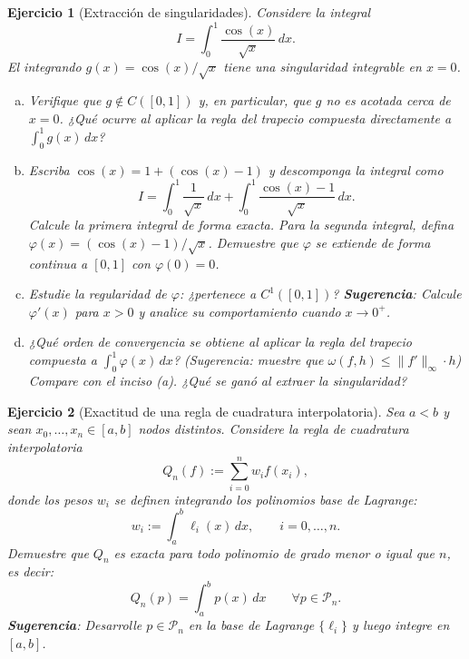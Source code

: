 \documentclass[12pt]{article}
\newtheorem{exercise}{Ejercicio}
\begin{document}
\begin{exercise}[Extracción de singularidades]
Considere la integral
\[
I = \int_0^1 \frac{\cos(x)}{\sqrt{x}}\, dx.
\]
El integrando $g(x) = \cos(x)/\sqrt{x}$ tiene una singularidad integrable en $x = 0$.
\begin{enumerate}[(a)]
\item Verifique que $g \notin C([0,1])$ y, en particular, que $g$ no es acotada cerca de $x = 0$. ¿Qué ocurre al aplicar la regla del trapecio compuesta directamente a $\int_0^1 g(x)\,dx$?
\item Escriba $\cos(x) = 1 + (\cos(x) - 1)$ y descomponga la integral como
\[
I = \int_0^1 \frac{1}{\sqrt{x}}\, dx + \int_0^1 \frac{\cos(x) - 1}{\sqrt{x}}\, dx.
\]
Calcule la primera integral de forma exacta. Para la segunda integral, defina $\varphi(x) = (\cos(x) - 1)/\sqrt{x}$. Demuestre que $\varphi$ se extiende de forma continua a $[0, 1]$ con $\varphi(0) = 0$.
\item Estudie la regularidad de $\varphi$: ¿pertenece a $C^1([0,1])$? \textbf{Sugerencia}: Calcule $\varphi'(x)$ para $x > 0$ y analice su comportamiento cuando $x \to 0^+$.
\item ¿Qué orden de convergencia se obtiene al aplicar la regla del trapecio compuesta a $\int_0^1 \varphi(x)\,dx$? (Sugerencia: muestre que $\omega(f, h) \leq \|f'\|_\infty \cdot h$) Compare con el inciso (a). ¿Qué se ganó al extraer la singularidad?
\end{enumerate}
\end{exercise}

\begin{exercise}[Exactitud de una regla de cuadratura interpolatoria]
Sea $a<b$ y sean $x_0,\ldots,x_n\in[a,b]$ nodos distintos. Considere la regla de cuadratura interpolatoria
\[
Q_n(f):=\sum_{i=0}^{n} w_i f(x_i),
\]
donde los pesos $w_i$ se definen integrando los polinomios base de Lagrange:
\[
w_i:=\int_a^b \ell_i(x)\,dx, \qquad i=0,\ldots,n.
\]
Demuestre que $Q_n$ es exacta para todo polinomio de grado menor o igual que $n$, es decir:
\[
Q_n(p)=\int_a^b p(x)\,dx \qquad \forall p\in\mathcal P_n.
\]
\textbf{Sugerencia}: Desarrolle $p\in\mathcal P_n$ en la base de Lagrange $\{\ell_i\}$ y luego integre en $[a,b]$.
\end{exercise}
\end{document}
